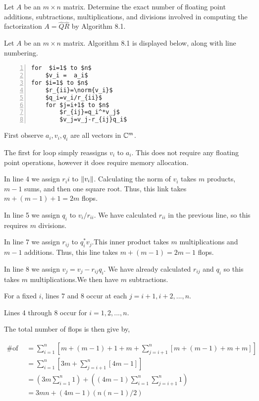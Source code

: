 \documentclass[10pt]{article}
\begin{document}
\begin{problem}[Exercise 8.1]
Let \( A \) be an \( m\times n \) matrix. Determine the exact number of floating point additions, subtractions, multiplications, and divisions involved in computing the factorization \( A=\hat{Q}\hat{R} \) by Algorithm 8.1.
\end{problem}

\begin{solution}[Solution]
Let \( A \) be an \( m\times n \) matrix. Algorithm 8.1 is displayed below, along with line numbering.

\begin{lstlisting}[mathescape=true, numbers=left, xleftmargin=2em,frame=single,framexleftmargin=1.5em]
for  $i=1$ to $n$
    $v_i =  a_i$
for $i=1$ to $n$
    $r_{ii}=\norm{v_i}$
    $q_i=v_i/r_{ii}$
    for $j=i+1$ to $n$
        $r_{ij}=q_i^*v_j$
        $v_j=v_j-r_{ij}q_i$
\end{lstlisting}

First observe \( a_i,v_i,q_i \) are all vectors in \( \mathbb{C}^m \).

The first for loop simply reassigns \( v_i \) to \( a_i \). This does not require any floating point operations, however it does require memory allocation.

In line 4 we assign \( r_ii \) to \( \left\lVert v_i\right\rVert \). Calculating the norm of \( v_i \) takes \( m \) products, \( m-1 \) sums, and then one square root.
Thus, this link takes \( m+(m-1)+1=2m \) flops.

In line 5 we assign \( q_i \) to \( v_i/r_{ii} \). We have calculated \( r_{ii} \) in the previous line, so this requires \( m \) divisions.

In line 7 we assign \( r_{ij} \) to \( q_i^*v_j \).This inner product takes \( m \) multiplications and \( m-1 \) additions.
Thus, this line takes \( m+(m-1)=2m-1 \) flops.

In line 8 we assign \( v_j=v_j- r_{ij}q_i \). We have already calculated \( r_{ij} \) and \( q_{i} \) so this takes \( m \) multiplications.We then have \( m \) subtractions.

For a fixed \( i \), lines 7 and 8 occur at each \( j=i+1, i+2, ..., n \).

Lines 4 through 8 occur for \( i=1,2, ..., n \).

The total number of flops is then give by,

\begin{align*}
    \text{\# of flops} &= \sum_{i=1}^{n}\left[ m+(m-1)+1+m+\sum_{j=i+1}^{n}[m+(m-1)+m+m] \right] \\
    &= \sum_{i=1}^{n}\left[3m+\sum_{j=i+1}^{n}[4m-1]\right] \\
    &=\left(3m\sum_{i=1}^{n}1\right)+\left((4m-1)\sum_{i=1}^{n}\sum_{j=i+1}^{n}1\right) \\
    &=3mn + (4m-1)(n(n-1)/2)
\end{align*}



\end{solution}
\end{document}
